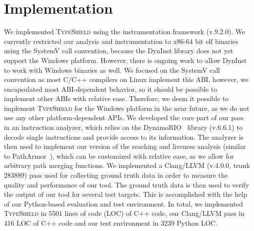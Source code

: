 \section{Implementation}
\label{chapter:Implementation}

We implemented \textsc{TypeShield} using the instrumentation framework (v.9.2.0). We currently restricted our analysis and instrumentation to x86-64 
bit elf binaries using the SystemV call convention, because the DynInst library does not yet support the
Windows platform. However, there is ongoing work to allow DynInst to work with Windows binaries as well. We focused on the SystemV call 
convention as most C/C++ compilers on Linux implement this ABI, however, we encapsulated most ABI-dependent behavior, so it should be 
possible to implement other ABIs with relative ease. Therefore, we deem it possible to implement \textsc{TypeShield} for the Windows 
platform in the near future, as we do not use any other platform-dependent APIs. We developed the core part of our pass in an instruction
analyzer, which relies on the DynamoRIO~\cite{dynamorio:drmemory} library (v.6.6.1) to decode single instructions and provide access to
its information. The analyzer is then used to implement our version of the reaching and liveness analysis (similar to PathArmor~\cite{veen:typearmor}), 
which can be customized with relative ease, as we allow for arbitrary path merging functions. We implemented a 
Clang/LLVM (v.4.0.0, trunk 283889) pass used for 
collecting ground truth data in order to measure the quality and performance of our tool. The ground truth data is then used to verify 
the output of our tool for several test targets. This is accomplished with the help of our Python-based evaluation and test environment. 
In total, we implemented \textsc{TypeShield} in 5501 lines of code (LOC) of C++ code, our Clang/LLVM pass in 416 LOC
of C++ code and our test environment in 3239 Python LOC. 


